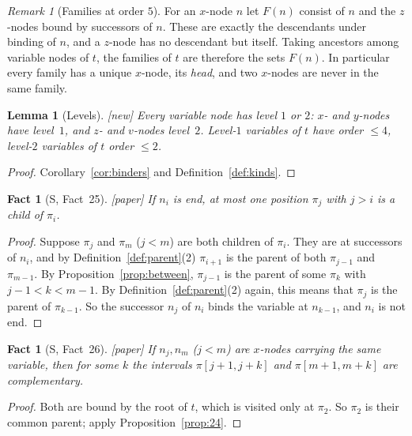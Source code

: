\documentclass[11pt]{article}
\newcommand{\iv}[2]{\pi[#1,#2]}
\newcommand{\Paper}{\textsf{[paper]}}
\newcommand{\New}{\textsf{[new]}}
\theoremstyle{plain}
\newtheorem{lemma}[theorem]{Lemma}
\newtheorem{fact}[theorem]{Fact}
\theoremstyle{definition}
\theoremstyle{remark}
\newtheorem{remark}[theorem]{Remark}
\begin{document}
\begin{remark}[Families at order $5$]
For an $x$-node $n$ let $F(n)$ consist of $n$ and the $z$-nodes bound by
successors of $n$.  These are exactly the descendants under binding of
$n$, and a $z$-node has no descendant but itself.  Taking ancestors
among variable nodes of $t$, the families of $t$ are therefore the sets
$F(n)$.  In particular every family has a unique $x$-node, its
\emph{head}, and two $x$-nodes are never in the same family.
\end{remark}

\begin{lemma}[Levels]\label{lem:levels}
\New{} Every variable node has level $1$ or $2$: $x$- and $y$-nodes
have level~$1$, and $z$- and $v$-nodes level~$2$.  Level-$1$ variables
of $t$ have order $\le4$, level-$2$ variables of $t$ order $\le2$.
\end{lemma}
\begin{proof}
Corollary~\ref{cor:binders} and Definition~\ref{def:kinds}.
\end{proof}

\begin{fact}[S, Fact~25]\label{fact:25}
\Paper{} If $n_i$ is end, at most one position $\pi_j$ with $j>i$ is a
child of $\pi_i$.
\end{fact}
\begin{proof}
Suppose $\pi_j$ and $\pi_m$ ($j<m$) are both children of $\pi_i$.  They
are at successors of $n_i$, and by Definition~\ref{def:parent}(2)
$\pi_{i+1}$ is the parent of both $\pi_{j-1}$ and $\pi_{m-1}$.  By
Proposition~\ref{prop:between}, $\pi_{j-1}$ is the parent of some
$\pi_k$ with $j-1<k<m-1$.  By Definition~\ref{def:parent}(2) again, this
means that $\pi_j$ is the parent of $\pi_{k-1}$.  So the successor $n_j$
of $n_i$ binds the variable at $n_{k-1}$, and $n_i$ is not end.
\end{proof}

\begin{fact}[S, Fact~26]\label{fact:26}
\Paper{} If $n_j,n_m$ ($j<m$) are $x$-nodes carrying the same
variable, then for some $k$ the intervals $\iv{j+1}{j+k}$ and
$\iv{m+1}{m+k}$ are complementary.
\end{fact}
\begin{proof}
Both are bound by the root of $t$, which is visited only at $\pi_2$.  So
$\pi_2$ is their common parent; apply Proposition~\ref{prop:24}.
\end{proof}
\end{document}
